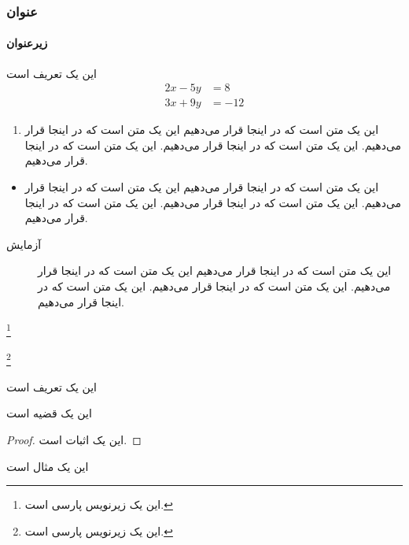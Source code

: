 \documentclass[10pt,xcolor=dvipsnames]{beamer}
\begin{document}
\begin{frame}
\frametitle{عنوان}
\framesubtitle{زیرعنوان}
\begin{definition}
این یک تعریف است 
\begin{align}
2x - 5y &=  8 \\ 
3x + 9y &=  -12
\end{align}
\end{definition}

\end{frame}
\begin{frame}
\ptext[1]
\begin{enumerate}
\item 
این یک متن است که در اینجا قرار می‌دهیم این یک متن است که در اینجا قرار می‌دهیم. این یک متن است که در اینجا قرار می‌دهیم. این یک متن است که در اینجا قرار می‌دهیم.
\end{enumerate}
\pause

\begin{itemize}
\item 
این یک متن است که در اینجا قرار می‌دهیم این یک متن است که در اینجا قرار می‌دهیم. این یک متن است که در اینجا قرار می‌دهیم. این یک متن است که در اینجا قرار می‌دهیم.
\end{itemize}

\begin{description}
\item[آزمایش]
این یک متن است که در اینجا قرار می‌دهیم این یک متن است که در اینجا قرار می‌دهیم. این یک متن است که در اینجا قرار می‌دهیم. این یک متن است که در اینجا قرار می‌دهیم.
\end{description}

\end{frame}
\begin{frame}

\footnote{این یک زیرنویس پارسی است.}%

%

%

\footnote{این یک زیرنویس پارسی است.}

\end{frame}
\begin{frame}
\ptext[1]
\begin{definition}
این یک تعریف است
\end{definition}
\pause

\begin{theorem}
این یک قضیه است
\end{theorem}
\pause

\begin{proof}
این یک اثبات است.
\end{proof}
\pause

\begin{example}
این یک مثال است
\end{example}
\end{frame}
\end{document}
